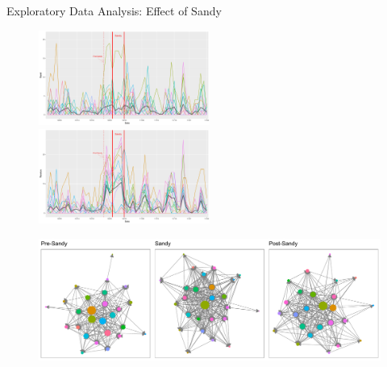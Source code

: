 \documentclass[10pt]{beamer}
\theoremstyle{definition}
\theoremstyle{remark}
\begin{document}
\begin{frame}{Exploratory Data Analysis: Effect of Sandy}
	\begin{minipage}{0.85\linewidth}
	 	 \begin{figure}
	 	 	\includegraphics[width=0.5\textwidth]{figures/Sendplot.pdf}	 	
	 	 	\includegraphics[width=0.5\textwidth]{figures/Receiveplot.pdf}
	 	 \end{figure}	
	 \begin{figure}
	 		 	\includegraphics[width=1\textwidth]{figures/Networkplot.pdf}
	 		 		 \end{figure}	
\end{minipage}
\begin{minipage}{0.13\linewidth}
		 \begin{figure}

\end{figure}
\end{minipage}
\end{frame}
\end{document}
